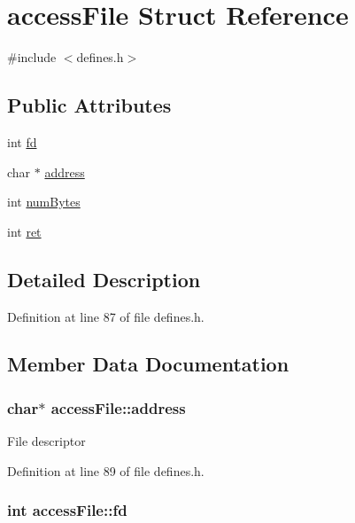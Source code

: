 \hypertarget{structaccess_file}{\section{access\-File Struct Reference}
\label{structaccess_file}
}


{\ttfamily \#include $<$defines.\-h$>$}

\subsection*{Public Attributes}
\begin{DoxyCompactItemize}
\item 
int \hyperlink{structaccess_file_a9ab395b069b2bd43673532852db9fc08}{fd}
\item 
char $\ast$ \hyperlink{structaccess_file_a8703e8c02cbe832f83766a84ec60679e}{address}
\item 
int \hyperlink{structaccess_file_a88da95f58ee0db9eff5d9fae8d94585f}{num\-Bytes}
\item 
int \hyperlink{structaccess_file_af78cfca94c3c5287dd6b843953eb1052}{ret}
\end{DoxyCompactItemize}


\subsection{Detailed Description}


Definition at line 87 of file defines.\-h.



\subsection{Member Data Documentation}
\hypertarget{structaccess_file_a8703e8c02cbe832f83766a84ec60679e}{
\subsubsection[{address}]{\setlength{\rightskip}{0pt plus 5cm}char$\ast$ access\-File\-::address}}\label{structaccess_file_a8703e8c02cbe832f83766a84ec60679e}
File descriptor 

Definition at line 89 of file defines.\-h.

\hypertarget{structaccess_file_a9ab395b069b2bd43673532852db9fc08}{
\subsubsection[{fd}]{\setlength{\rightskip}{0pt plus 5cm}int access\-File\-::fd}}\label{structaccess_file_a9ab395b069b2bd43673532852db9fc08}


